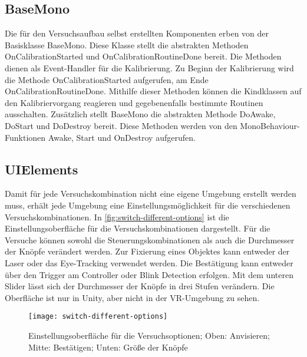 \subsection{BaseMono}
Die für den Versuchsaufbau selbst erstellten Komponenten erben von der Basisklasse {\ttfamily BaseMono}. Diese Klasse stellt die abstrakten Methoden {\ttfamily OnCalibrationStarted} und {\ttfamily OnCalibrationRoutineDone} bereit. Die Methoden dienen als Event-Handler für die Kalibrierung. Zu Beginn der Kalibrierung wird die Methode {\ttfamily OnCalibrationStarted} aufgerufen, am Ende {\ttfamily OnCalibrationRoutineDone}. Mithilfe dieser Methoden können die Kindklassen auf den Kalibriervorgang reagieren und gegebenenfalls bestimmte Routinen ausschalten. Zusätzlich stellt {\ttfamily BaseMono} die abstrakten Methode {\ttfamily DoAwake}, {\ttfamily DoStart} und {\ttfamily DoDestroy} bereit. Diese Methoden werden von den MonoBehaviour-Funktionen {\ttfamily Awake}, {\ttfamily Start} und {\ttfamily OnDestroy} aufgerufen.

\subsection{UIElements}
Damit für jede Versuchskombination nicht eine eigene Umgebung erstellt werden muss, erhält jede Umgebung eine Einstellungsmöglichkeit für die verschiedenen Versuchskombinationen. In \autoref{fig:switch-different-options} ist die Einstellungsoberfläche für die Versuchskombinationen dargestellt. Für die Versuche können sowohl die Steuerungskombinationen als auch die Durchmesser der Knöpfe verändert werden. Zur Fixierung eines Objektes kann entweder der Laser oder das Eye-Tracking verwendet werden. Die Bestätigung kann entweder über den Trigger am Controller oder Blink Detection erfolgen. Mit dem unteren Slider lässt sich der Durchmesser der Knöpfe in drei Stufen verändern. Die Oberfläche ist nur in Unity, aber nicht in der \ac{VR}-Umgebung zu sehen.

\begin{figure}[!htbp]
	\centering
	\texttt{[image: switch-different-options]}
	\caption[Einstellungsoberfläche für die Versuchsoptionen]{Einstellungsoberfläche für die Versuchsoptionen; Oben: Anvisieren; Mitte: Bestätigen; Unten: Größe der Knöpfe}
	\label{fig:switch-different-options}
\end{figure}


